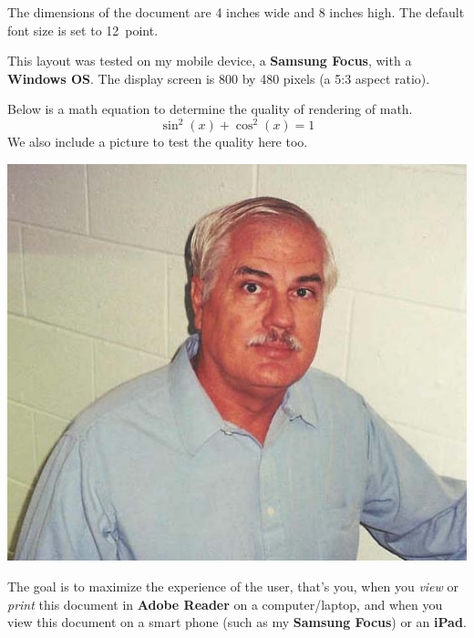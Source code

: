 \documentclass[\ifsmartphone12pt\fi,fleqn]{article}
\begin{document}
\ifsmartphone\makeinlinetitle
\else\maketitle\fi


The dimensions of the document are 4 inches wide and 8 inches high. The
default font size is set to 12~point.

This layout was tested on my mobile device, a \textbf{\textsf{Samsung
Focus}}, with a \textbf{\textsf{Windows OS}}. The display screen is 800 by
480 pixels (a 5:3 aspect ratio).

Below is a math equation to determine the quality of rendering of math.
\[
  \sin^2(x) + \cos^2(x) = 1
\]
We also include a picture to test the quality here too.
\begin{center}
    \includegraphics[width=.67\linewidth]{dpsweb}
\end{center}

The goal is to maximize the experience of the user, that's you, when you
\emph{view} or \emph{print} this document in \textbf{Adobe Reader} on a
computer/laptop, and when you view this document on a smart phone (such as
my \textbf{\textsf{Samsung Focus}}) or an \textbf{\textsf{iPad}}.
\end{document}

